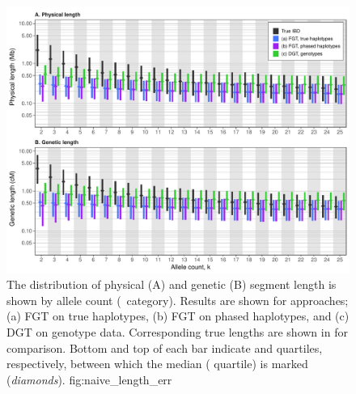 

\begin{figure}[!htb]
\includegraphics[width=\textwidth]{./img/ch4/length_naive_err.pdf}
{The distribution of physical (A) and genetic (B) segment length is shown by allele count (\fk{}~category).
Results are shown for  approaches; (a) FGT on true haplotypes, (b) FGT on phased haplotypes, and (c) DGT on genotype data.
Corresponding true lengths are shown in for comparison.
Bottom and top of each bar indicate  and  quartiles, respectively, between which the median ( quartile) is marked (\emph{diamonds}).}
{fig:naive_length_err}
\end{figure}
